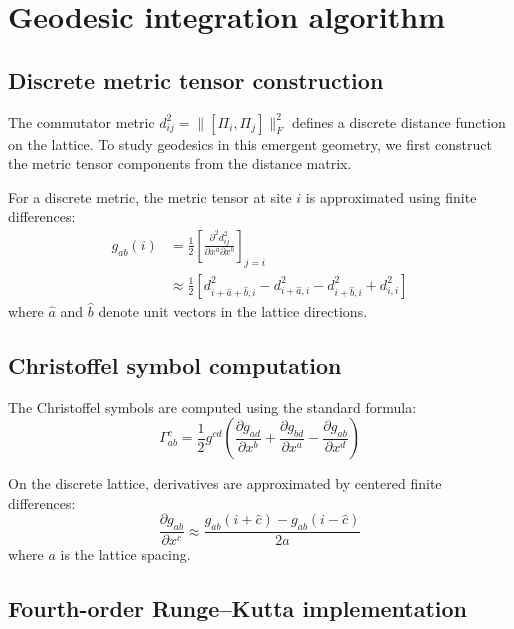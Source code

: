 
\section{Geodesic integration algorithm}
\label{app:geodesic}

\subsection{Discrete metric tensor construction}

The commutator metric $d_{ij}^2 = \|[\Pi_i,\Pi_j]\|_F^2$ defines a discrete distance function on the lattice. To study geodesics in this emergent geometry, we first construct the metric tensor components from the distance matrix.

For a discrete metric, the metric tensor at site $i$ is approximated using finite differences:
\begin{align}
g_{ab}(i) &= \frac{1}{2}\left[ \frac{\partial^2 d_{ij}^2}{\partial x^a \partial x^b}\right]_{j=i} \\
&\approx \frac{1}{2}\left[ d_{i+\hat{a}+\hat{b},i}^2 - d_{i+\hat{a},i}^2 - d_{i+\hat{b},i}^2 + d_{i,i}^2 \right]
\end{align}
where $\hat{a}$ and $\hat{b}$ denote unit vectors in the lattice directions.

\subsection{Christoffel symbol computation}

The Christoffel symbols are computed using the standard formula:
\begin{equation}
\Gamma^c_{ab} = \frac{1}{2} g^{cd} \left( \frac{\partial g_{ad}}{\partial x^b} + \frac{\partial g_{bd}}{\partial x^a} - \frac{\partial g_{ab}}{\partial x^d} \right)
\end{equation}

On the discrete lattice, derivatives are approximated by centered finite differences:
\begin{equation}
\frac{\partial g_{ab}}{\partial x^c} \approx \frac{g_{ab}(i+\hat{c}) - g_{ab}(i-\hat{c})}{2a}
\end{equation}
where $a$ is the lattice spacing.

\subsection{Fourth-order Runge--Kutta implementation}

